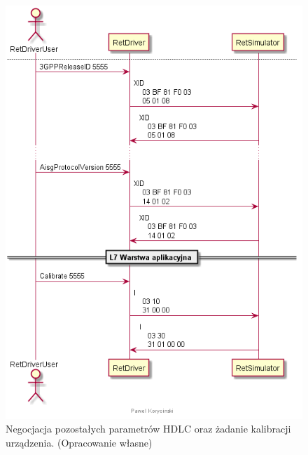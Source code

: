     \begin{figure}[h!]
    \centering
    \includegraphics[scale=0.75]{out/Diagramy/UML_DiagramOfSequence_New/KalibracjaRETa-page4.png}
    \caption{Negocjacja pozostałych parametrów HDLC oraz żadanie kalibracji urządzenia.
        \newline(Opracowanie własne)}
    \end{figure}

